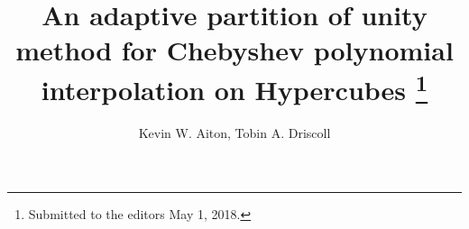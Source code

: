 

\usepackage{lipsum}
\usepackage{amsfonts}
\usepackage{graphicx}
\usepackage{epstopdf}
\usepackage{algorithmic}
\ifpdf
\else
\fi

\newcommand{\creflastconjunction}{, and~}






\title{An adaptive partition of unity method for Chebyshev polynomial interpolation on Hypercubes \thanks{Submitted to the editors May 1, 2018.
}}

\author{Kevin W. Aiton, Tobin A. Driscoll}

\usepackage{amsopn}
\DeclareMathOperator{\diag}{diag}


